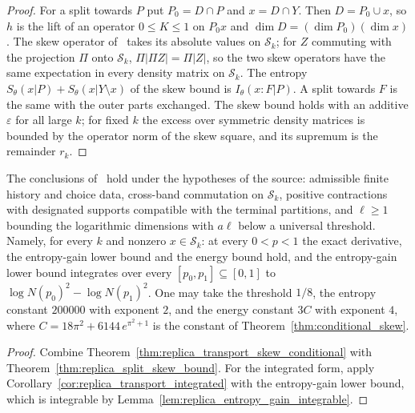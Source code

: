 \begin{proof}\leanok
    For a split towards $P$ put $P_0=D\cap P$ and $x=D\cap Y$. Then $D=P_0\cup x$, so $h$ is
    the lift of an operator $0\le K\le1$ on $P_0x$ and $\dim D=(\dim P_0)(\dim x)$. The skew
    operator of~\cite[Lemma~6.4]{OpenAI2026AreaLaw} takes its absolute values on
    $\mathcal S_k$; for $Z$ commuting with the projection $\Pi$ onto $\mathcal S_k$,
    $\Pi|\Pi Z|=\Pi|Z|$, so the two skew operators have the same expectation in every
    density matrix on $\mathcal S_k$. The entropy $S_\theta(x|P)+S_\theta(x|Y\setminus x)$
    of the skew bound is $I_\theta(x:F|P)$. A split towards $F$ is the same with the outer
    parts exchanged. The skew bound holds with an additive $\varepsilon$ for all large $k$;
    for fixed $k$ the excess over symmetric density matrices is bounded by the operator norm
    of the skew square, and its supremum is the remainder $r_k$.
\end{proof}

\begin{theorem}\label{thm:replica_transport}
    \leanok
    The conclusions of~\cite[Proposition~7.4]{OpenAI2026AreaLaw} hold under the hypotheses
    of the source: admissible finite history and choice data, cross-band commutation on
    $\mathcal S_k$, positive contractions with designated supports compatible with the
    terminal partitions, and $\ell\ge1$ bounding the logarithmic dimensions with $a\ell$
    below a universal threshold. Namely, for every $k$ and nonzero $x\in\mathcal S_k$: at
    every $0<p<1$ the exact derivative, the entropy-gain lower bound and the energy bound
    hold, and the entropy-gain lower bound integrates over every $[p_0,p_1]\subseteq[0,1]$
    to $\log N(p_0)^2-\log N(p_1)^2$. One may take the threshold $1/8$, the entropy
    constant $200000$ with exponent $2$, and the energy constant $3C$ with exponent $4$,
    where $C=18\pi^2+6144\,e^{\pi^2+1}$ is the constant of
    Theorem~\ref{thm:conditional_skew}.
\end{theorem}

\begin{proof}\leanok
    Combine Theorem~\ref{thm:replica_transport_skew_conditional} with
    Theorem~\ref{thm:replica_split_skew_bound}. For the integrated form, apply
    Corollary~\ref{cor:replica_transport_integrated} with the entropy-gain lower bound,
    which is integrable by Lemma~\ref{lem:replica_entropy_gain_integrable}.
\end{proof}


